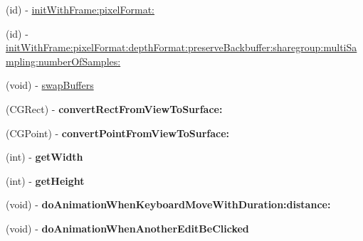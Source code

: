 \begin{DoxyCompactItemize}
(id) -\/ \hyperlink{interfaceCCEAGLView_ad2edc9a56bec3887260f222686111d34}{init\+With\+Frame\+:pixel\+Format\+:}
\item 
(id) -\/ \hyperlink{interfaceCCEAGLView_adaca2cf585c2dc4881a07bc78a0fad61}{init\+With\+Frame\+:pixel\+Format\+:depth\+Format\+:preserve\+Backbuffer\+:sharegroup\+:multi\+Sampling\+:number\+Of\+Samples\+:}
\item 
(void) -\/ \hyperlink{interfaceCCEAGLView_adb64cde54fee9dedd5004416f59fc0a7}{swap\+Buffers}
\item 
\mbox{\label{interfaceCCEAGLView_a9a39b024ce381e836ba7dc52476d4f61}} 
(C\+G\+Rect) -\/ {\bfseries convert\+Rect\+From\+View\+To\+Surface\+:}
\item 
\mbox{\label{interfaceCCEAGLView_a1abe9b7e051d6c2cccd0ea7d31df7aad}} 
(C\+G\+Point) -\/ {\bfseries convert\+Point\+From\+View\+To\+Surface\+:}
\item 
\mbox{\label{interfaceCCEAGLView_ab7255befab3b5c559c069265ff18205c}} 
(int) -\/ {\bfseries get\+Width}
\item 
\mbox{\label{interfaceCCEAGLView_ac466334393f7b0d0c30f1a29c4d34f47}} 
(int) -\/ {\bfseries get\+Height}
\item 
\mbox{\label{interfaceCCEAGLView_a803433071ee9f83f12e09d16112c60ab}} 
(void) -\/ {\bfseries do\+Animation\+When\+Keyboard\+Move\+With\+Duration\+:distance\+:}
\item 
\mbox{\label{interfaceCCEAGLView_a1b689dd226db20805c42c5aaeb6a8408}} 
(void) -\/ {\bfseries do\+Animation\+When\+Another\+Edit\+Be\+Clicked}
\end{DoxyCompactItemize}
